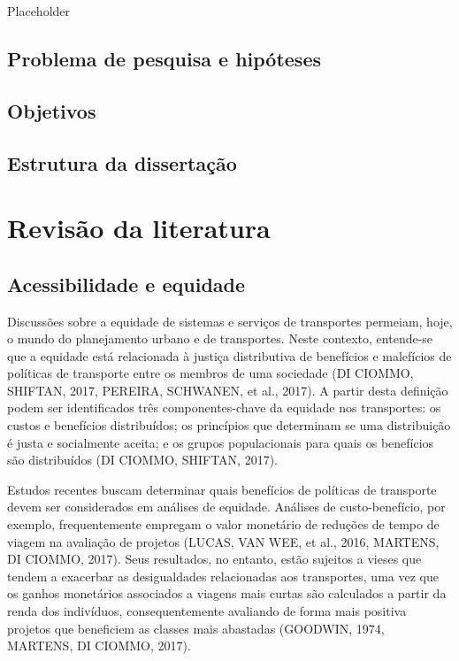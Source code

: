 \documentclass[msc,numbers]{coppe}
\begin{document}
  Placeholder

  \hypertarget{problema-de-pesquisa-e-hipuxf3teses}{%
  \section{Problema de pesquisa e hipóteses}\label{problema-de-pesquisa-e-hipuxf3teses}}

  \hypertarget{objetivos}{%
  \section{Objetivos}\label{objetivos}}

  \hypertarget{estrutura-da-dissertauxe7uxe3o}{%
  \section{Estrutura da dissertação}\label{estrutura-da-dissertauxe7uxe3o}}

  \hypertarget{revisuxe3o-da-literatura}{%
  \chapter{Revisão da literatura}\label{revisuxe3o-da-literatura}}

  \hypertarget{acessibilidade-e-equidade}{%
  \section{Acessibilidade e equidade}\label{acessibilidade-e-equidade}}

  Discussões sobre a equidade de sistemas e serviços de transportes permeiam, hoje, o mundo do planejamento urbano e de transportes. Neste contexto, entende-se que a equidade está relacionada à justiça distributiva de benefícios e malefícios de políticas de transporte entre os membros de uma sociedade (DI CIOMMO, SHIFTAN, 2017, PEREIRA, SCHWANEN, et al., 2017). A partir desta definição podem ser identificados três componentes-chave da equidade nos transportes: os custos e benefícios distribuídos; os princípios que determinam se uma distribuição é justa e socialmente aceita; e os grupos populacionais para quais os benefícios são distribuídos (DI CIOMMO, SHIFTAN, 2017).

  Estudos recentes buscam determinar quais benefícios de políticas de transporte devem ser considerados em análises de equidade. Análises de custo-benefício, por exemplo, frequentemente empregam o valor monetário de reduções de tempo de viagem na avaliação de projetos (LUCAS, VAN WEE, et al., 2016, MARTENS, DI CIOMMO, 2017). Seus resultados, no entanto, estão sujeitos a vieses que tendem a exacerbar as desigualdades relacionadas aos transportes, uma vez que os ganhos monetários associados a viagens mais curtas são calculados a partir da renda dos indivíduos, consequentemente avaliando de forma mais positiva projetos que beneficiem as classes mais abastadas (GOODWIN, 1974, MARTENS, DI CIOMMO, 2017).
\end{document}
